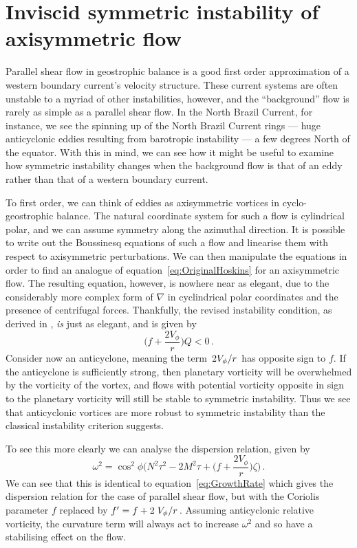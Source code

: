 \section{Inviscid symmetric instability of axisymmetric flow}
\label{sec:InviscidCentrifugal}
Parallel shear flow in geostrophic balance is a good first order approximation of a western boundary current's velocity structure. These current systems are often unstable to a myriad of other instabilities, however, and the ``background'' flow is rarely as simple as a parallel shear flow. In the North Brazil Current, for instance, we see the spinning up of the North Brazil Current rings --- huge anticyclonic eddies resulting from barotropic instability --- a few degrees North of the equator. With this in mind, we can see how it might be useful to examine how symmetric instability changes when the background flow is that of an eddy rather than that of a western boundary current.

To first order, we can think of eddies as axisymmetric vortices in cyclo-geostrophic balance. The natural coordinate system for such a flow is cylindrical polar, and we can assume symmetry along the azimuthal direction. It is possible to write out the Boussinesq equations of such a flow and linearise them with respect to axisymmetric perturbations. We can then manipulate the equations in order to find an analogue of equation~\ref{eq:OriginalHoskins} for an axisymmetric flow. The resulting equation, however, is nowhere near as elegant, due to the considerably more complex form of $\nabla$ in cyclindrical polar coordinates and the presence of centrifugal forces\footnotemark. Thankfully, the revised instability condition, as derived in \citet{Buckingham2021}, \textit{is} just as elegant, and is given by
\begin{equation}
    \bigg(f + \frac{2 V_\phi}{r}\bigg)Q < 0 \, .
\end{equation}
Consider now an anticyclone, meaning the term $\flatfrac{2V_\phi}{r}$ has opposite sign to $f$. If the anticyclone is sufficiently strong, then planetary vorticity will be overwhelmed by the vorticity of the vortex, and flows with potential vorticity  opposite in sign to the planetary vorticity will still be stable to symmetric instability. Thus we see that anticyclonic vortices are more robust to symmetric instability than the classical instability criterion suggests.

To see this more clearly we can analyse the dispersion relation, given by
\begin{equation}
    \label{eq:GrowthRateCurv}
    \omega^2 = \cos^2\phi \Bigg(N^2 \tau^2 - 2M^2\tau + \bigg(f + \frac{2V_\phi}{r}\bigg)\zeta\Bigg) \, .
\end{equation}
We can see that this is identical to equation~\ref{eq:GrowthRate} which gives the dispersion relation for the case of parallel shear flow, but with the Coriolis parameter $f$ replaced by $f' = f + 2 \flatfrac{V_\phi}{r}$. Assuming anticyclonic relative vorticity, the curvature term will always act to increase $\omega^2$ and so have a stabilising effect on the flow.

